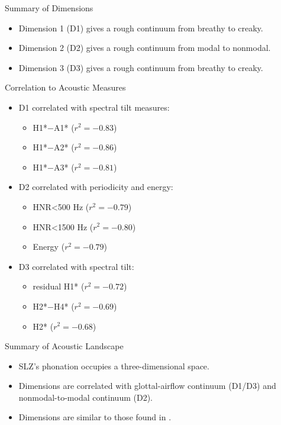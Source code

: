 \documentclass[professionalfont]{beamer}
\begin{document}
\begin{frame}{Summary of Dimensions}
  \begin{itemize}
    \item Dimension 1 (D1) gives a rough continuum from breathy to creaky.
    \item Dimension 2 (D2) gives a rough continuum from modal to nonmodal.
    \item Dimension 3 (D3) gives a rough continuum from breathy to creaky.
  \end{itemize}
\end{frame}

\begin{frame}{Correlation to Acoustic Measures}
  \begin{itemize}
    \item D1 correlated with spectral tilt measures: 
    \begin{itemize}
      \item H1*$-$A1* ($r^2 = -0.83$) 
      \item H1*$-$A2* ($r^2 = -0.86$)
      \item H1*$-$A3* ($r^2 = -0.81$)
    \end{itemize}
    \item D2 correlated with periodicity and energy: 
    \begin{itemize}
      \item HNR\textless 500 Hz ($r^2 = -0.79$)
      \item HNR\textless 1500 Hz ($r^2 = -0.80$)
      \item Energy ($r^2 = -0.79$)
    \end{itemize}
    \item D3 correlated with spectral tilt:
    \begin{itemize}
      \item residual H1* ($r^2 = -0.72$)
      \item H2*$-$H4* ($r^2 = -0.69$)
      \item H2* ($r^2 = -0.68$)
    \end{itemize}
  \end{itemize}
\end{frame}

\begin{frame}{Summary of Acoustic Landscape}
  \begin{itemize}
    \item SLZ's phonation occupies a three-dimensional space.
    \item Dimensions are correlated with glottal-airflow continuum (D1/D3) and nonmodal-to-modal continuum (D2).
    \item Dimensions are similar to those found in \citet{keatingCrosslanguageAcousticSpace2023}.
  \end{itemize}
\end{frame}
\end{document}
